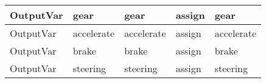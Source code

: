 \begin{tabularx}{\textwidth}{sssBs}
                       
                       OutputVar & gear  & gear  & assign & gear \\ \hline
                            OutputVar & accelerate & accelerate & assign & accelerate \\ \hline
                            OutputVar & brake & brake & assign & brake \\ \hline
                            OutputVar & steering & steering & assign & steering \\ \hline
                                  
          \bottomrule
     \end{tabularx}%